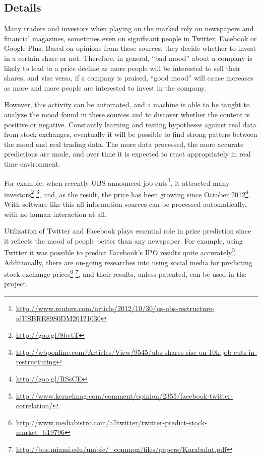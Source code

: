 \documentclass[a4paper,12pt]{article}
\begin{document}
\subsection*{Details}

Many traders and investors when playing on the marked rely on newspapers and financial magazines, sometimes even on significant people in Twitter, Facebook or Google Plus. Based on opinions from these sources, they decide whether to invest in a certain share or not. Therefore, in general, ``bad mood'' about a company is likely to lead to a price decline as more people will be interested to sell their shares, and vise versa, if a company is praised, ``good mood'' will cause increases as more and more people are interested to invest in the company.

However, this activity can be automated, and a machine is able to be taught to analyze the mood found in these sources and to discover whether the content is positive or negative. Constantly learning and testing hypotheses against real data from stock exchanges, eventually it will be possible to find strong patters between the mood and real trading data. The more data processed, the more accurate predictions are made, and over time it is expected to react appropriately in real time environment.

For example, when recently UBS announced job cuts\footnote{\url{http://www.reuters.com/article/2012/10/30/us-ubs-restructure-idUSBRE89S0DM20121030}}, it attracted many investors\footnote{\url{http://goo.gl/8bvtT}} \footnote{\url{http://wbponline.com/Articles/View/9545/ubs-shares-rise-on-10k-job-cuts-in-restructuring}}, and, as the result, the price has been growing since October 2012\footnote{\url{http://goo.gl/RSsCE}}. With software like this all information sources can be processed automatically, with no human interaction at all.

Utilization of Twitter and Facebook plays essential role in price prediction since it reflects the mood of people better than any newspaper. For example, using Twitter it was possible to predict Facebook's IPO results quite accurately\footnote{\url{http://www.kernelmag.com/comment/opinion/2355/facebook-twitter-correlation/}}. Additionally, there are on-going researches into using social media for predicting stock exchange prices\footnote{\url{http://www.mediabistro.com/alltwitter/twitter-predict-stock-market_b19796}} \footnote{\url{http://bus.miami.edu/umbfc/_common/files/papers/Karabulut.pdf}}, and their results, unless patented, can be used in the project.
\end{document}
